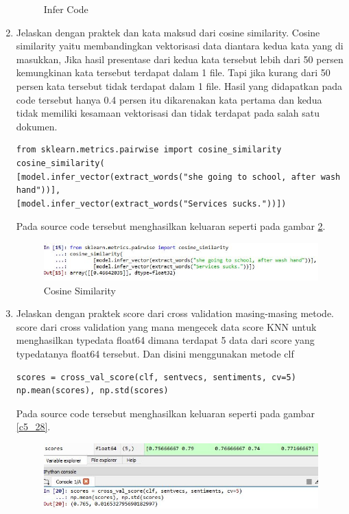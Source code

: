 \begin{enumerate}
\begin{figure}[!htbp]
	\caption{Infer Code}
	\label{c5_26}
\end{figure}
\item Jelaskan dengan praktek dan kata maksud dari cosine similarity.
\subitem Cosine similarity yaitu membandingkan vektorisasi data diantara kedua kata yang di masukkan, Jika hasil presentase dari kedua kata tersebut lebih dari 50 persen kemungkinan kata tersebut terdapat dalam 1 file. Tapi jika kurang dari 50 persen kata tersebut tidak terdapat dalam 1 file. Hasil yang didapatkan pada code tersebut hanya 0.4 persen itu dikarenakan kata pertama dan kedua tidak memiliki kesamaan vektorisasi dan tidak terdapat pada salah satu dokumen.
\begin{verbatim}
from sklearn.metrics.pairwise import cosine_similarity
cosine_similarity(
[model.infer_vector(extract_words("she going to school, after wash hand"))],
[model.infer_vector(extract_words("Services sucks."))])
\end{verbatim}
\subitem Pada source code tersebut menghasilkan keluaran seperti pada gambar \ref{c5_27}.
\begin{figure}[!htbp]
	\centerline{\includegraphics[width=1\textwidth]{figures/huda/chapter5/27.JPG}}
	\caption{Cosine Similarity}
	\label{c5_27}
\end{figure}
\item Jelaskan dengan praktek score dari cross validation masing-masing metode.
\subitem score dari cross validation yang mana mengecek data score KNN untuk menghasilkan typedata float64 dimana terdapat 5 data dari score yang typedatanya float64 tersebut. Dan disini menggunakan metode clf
\begin{verbatim}
scores = cross_val_score(clf, sentvecs, sentiments, cv=5)
np.mean(scores), np.std(scores)
\end{verbatim}
\subitem Pada source code tersebut menghasilkan keluaran seperti pada gambar \ref{c5_28}.
\begin{figure}[!htbp]
	\centerline{\includegraphics[width=1\textwidth]{figures/huda/chapter5/28.JPG}}

\end{figure}
\end{enumerate}
